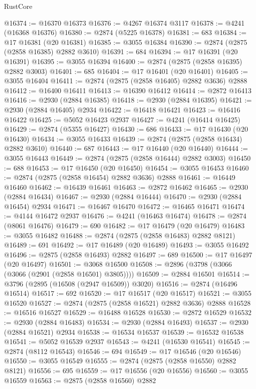 \begin{lexlean}{RustCore}
\begin{coremodule}
@16374 := @16370 @16373
@16376 := @4267 @16374 @3117
@16378 := @4241 (@16368 @16376)
@16380 := @2874 (@5225 @16378)
@16381 := 683
@16384 := @17 @16381 (@20 @16381)
@16385 := @3055 @16384
@16390 := @2874 (@2875 (@2858 @16385) @2882 @3610)
@16391 := 684
@16394 := @17 @16391 (@20 @16391)
@16395 := @3055 @16394
@16400 := @2874 (@2875 (@2858 @16395) @2882 @3003)
@16401 := 685
@16404 := @17 @16401 (@20 @16401)
@16405 := @3055 @16404
@16411 := @2874 (@2875 (@2858 @16405) @2882 @3636) @2888
@16412 := @16400 @16411
@16413 := @16390 @16412
@16414 := @2872 @16413
@16416 := @2930 (@2884 @16385)
@16418 := @2930 (@2884 @16395)
@16421 := @2930 (@2884 @16405) @2934
@16422 := @16418 @16421
@16423 := @16416 @16422
@16425 := @5052 @16423 @2937
@16427 := @4241 (@16414 @16425)
@16429 := @2874 (@5355 @16427)
@16430 := 686
@16433 := @17 @16430 (@20 @16430)
@16434 := @3055 @16433
@16439 := @2874 (@2875 (@2858 @16434) @2882 @3610)
@16440 := 687
@16443 := @17 @16440 (@20 @16440)
@16444 := @3055 @16443
@16449 := @2874 (@2875 (@2858 @16444) @2882 @3003)
@16450 := 688
@16453 := @17 @16450 (@20 @16450)
@16454 := @3055 @16453
@16460 := @2874 (@2875 (@2858 @16454) @2882 @3636) @2888
@16461 := @16449 @16460
@16462 := @16439 @16461
@16463 := @2872 @16462
@16465 := @2930 (@2884 @16434)
@16467 := @2930 (@2884 @16444)
@16470 := @2930 (@2884 @16454) @2934
@16471 := @16467 @16470
@16472 := @16465 @16471
@16474 := @4144 @16472 @2937
@16476 := @4241 (@16463 @16474)
@16478 := @2874 (@8061 @16476)
@16479 := 690
@16482 := @17 @16479 (@20 @16479)
@16483 := @3055 @16482
@16488 := @2874 (@2875 (@2858 @16483) @2882 @8121)
@16489 := 691
@16492 := @17 @16489 (@20 @16489)
@16493 := @3055 @16492
@16496 := @2875 (@2858 @16493) @2882
@16497 := 689
@16500 := @17 @16497 (@20 @16497)
@16501 := @3068 @16500
@16508 := @2896 (@3798 (@3066 (@3066 (@2901 (@2858 @16501) @3805))))
@16509 := @2884 @16501
@16514 := @3796 (@2895 (@16508 (@2947 @16509)) @3020)
@16516 := @2874 (@16496 @16514)
@16517 := 692
@16520 := @17 @16517 (@20 @16517)
@16521 := @3055 @16520
@16527 := @2874 (@2875 (@2858 @16521) @2882 @3636) @2888
@16528 := @16516 @16527
@16529 := @16488 @16528
@16530 := @2872 @16529
@16532 := @2930 (@2884 @16483)
@16534 := @2930 (@2884 @16493)
@16537 := @2930 (@2884 @16521) @2934
@16538 := @16534 @16537
@16539 := @16532 @16538
@16541 := @5052 @16539 @2937
@16543 := @4241 (@16530 @16541)
@16545 := @2874 (@8112 @16543)
@16546 := 694
@16549 := @17 @16546 (@20 @16546)
@16550 := @3055 @16549
@16555 := @2874 (@2875 (@2858 @16550) @2882 @8121)
@16556 := 695
@16559 := @17 @16556 (@20 @16556)
@16560 := @3055 @16559
@16563 := @2875 (@2858 @16560) @2882

\end{coremodule}
\end{lexlean}
